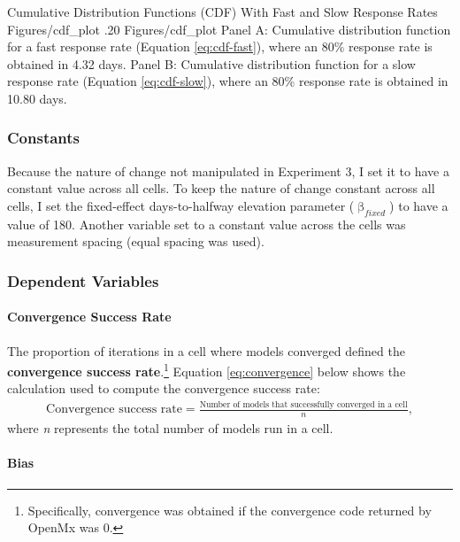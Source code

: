 \documentclass[
12pt, %
twoside,
english]{guelphthesis}
\begin{document}
\begin{apaFigure}
[portrait]
[samepage]
[0cm]
{Cumulative Distribution Functions (CDF) With Fast and Slow Response Rates}
{Figures/cdf_plot}
{.20}
{Figures/cdf_plot}
{Panel A: Cumulative distribution function for a fast response rate (Equation \ref{eq:cdf-fast}), where an 80\% response rate is obtained in 4.32 days. Panel B: Cumulative distribution function for a slow response rate (Equation \ref{eq:cdf-slow}), where an 80\% response rate is obtained in 10.80 days.}
\end{apaFigure}
\hypertarget{constants-2}{%
\subsubsection{Constants}\label{constants-2}}

Because the nature of change not manipulated in Experiment 3, I set it to have a constant value across all cells. To keep the nature of change constant across all cells, I set the fixed-effect days-to-halfway elevation parameter (\(\upbeta_{fixed}\)) to have a value of 180. Another variable set to a constant value across the cells was measurement spacing (equal spacing was used).

\hypertarget{dependent-variables-2}{%
\subsubsection{Dependent Variables}\label{dependent-variables-2}}

\hypertarget{convergence-success-rate-1}{%
\paragraph{Convergence Success Rate}\label{convergence-success-rate-1}}

The proportion of iterations in a cell where models converged defined
the \textbf{convergence success rate}.\footnote{Specifically, convergence was obtained if the convergence code returned by OpenMx was 0.} Equation \eqref{eq:convergence} below shows the calculation used to compute the convergence success rate:
\begin{align}
  \text{Convergence success rate} =  \frac{\text{Number of models that successfully converged in a cell}}{n},
  \label{eq:convergence} 
\end{align}
\noindent where \emph{n} represents the total number of models run in a cell.

\hypertarget{bias-1}{%
\paragraph{Bias}\label{bias-1}}
\end{document}
